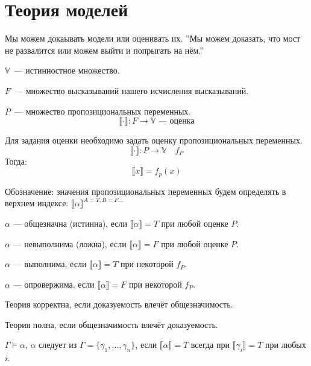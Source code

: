 \section{Теория моделей}
Мы можем докаывать модели или оценивать их.
''Мы можем доказать, что мост не развалится или можем выйти и попрыгать на нём.''

\begin{definition}
    $\mathbb{V}$~--- истинностное множество.

    $F$~--- множество высказываний нашего исчисления высказываний.

    $P$~--- множество пропозициональных переменных.
    \[ \llbracket\cdot\rrbracket: F \to \mathbb{V} \text{~--- оценка}\]
\end{definition}

\begin{definition}
    Для задания оценки необходимо задать оценку пропозициональных переменных.
    \[\llbracket \cdot \rrbracket : P\to \mathbb{V} \quad f_P\]
    Тогда: 
    \[ \llbracket x \rrbracket = f_p(x)\]
\end{definition}

\begin{remark}
    Обозначение: значения пропозициональных переменных будем определять в верхнем индексе: $\llbracket \alpha \rrbracket ^{A = T, B = F \ldots}$
\end{remark}


\begin{definition}
    $\alpha$ --- общезначна (истинна), если $\llbracket \alpha \rrbracket = T$ при любой оценке $P$.

    $\alpha$ --- невыполнима (ложна), если $\llbracket \alpha \rrbracket = F$ при любой оценке $P$.
    
    $\alpha$ --- выполнима, если $\llbracket \alpha \rrbracket = T$ при некоторой $f_P$.

    $\alpha$ --- опровержима, если $\llbracket \alpha \rrbracket = F$ при некоторой $f_P$.
\end{definition}

\begin{definition}
    Теория корректна, если доказуемость влечёт общезначимость.

    Теория полна, если общезначимость влечёт доказуемость.
\end{definition}

\begin{definition}
    $\Gamma \vDash \alpha$, $\alpha$ следует из $\Gamma = \{ \gamma_1, \ldots, \gamma_n\}$, если $\llbracket \alpha \rrbracket = T$ всегда при $\llbracket \gamma_i \rrbracket = T$ при любых $i$.  
\end{definition}

